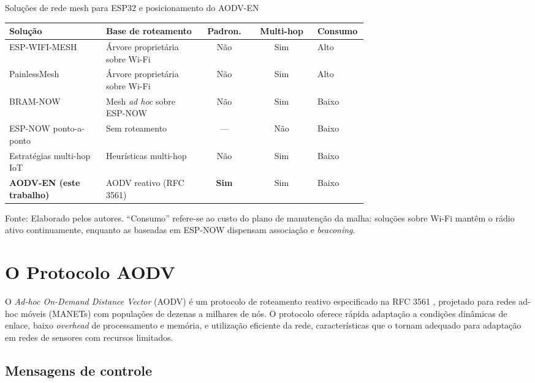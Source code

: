 \begin{quadro}[H]
\centering
\caption{Soluções de rede mesh para ESP32 e posicionamento do AODV-EN}\label{quadro:correlatos}
\begin{tabular}{@{}>{\raggedright\arraybackslash}p{0.27\linewidth}>{\raggedright\arraybackslash}p{0.27\linewidth}cc>{\raggedright\arraybackslash}p{0.14\linewidth}@{}}
\toprule
Solução & Base de roteamento & Padron. & Multi-hop & Consumo \\
\midrule
ESP-WIFI-MESH \cite{sestak2022} & Árvore proprietária sobre Wi-Fi & Não & Sim & Alto \\
PainlessMesh \cite{sestak2022} & Árvore proprietária sobre Wi-Fi & Não & Sim & Alto \\
BRAM-NOW \cite{cujilema2023} & Mesh \emph{ad hoc} sobre ESP-NOW & Não & Sim & Baixo \\
ESP-NOW ponto-a-ponto \cite{becker2025} & Sem roteamento & --- & Não & Baixo \\
Estratégias multi-hop IoT \cite{arregui2025} & Heurísticas multi-hop & Não & Sim & Baixo \\
\textbf{AODV-EN (este trabalho)} & AODV reativo (RFC 3561) & \textbf{Sim} & Sim & Baixo \\
\bottomrule
\end{tabular}

\vspace{2pt}
{\footnotesize Fonte: Elaborado pelos autores. ``Consumo'' refere-se ao custo do plano de manutenção da malha: soluções sobre Wi-Fi mantêm o rádio ativo continuamente, enquanto as baseadas em ESP-NOW dispensam associação e \emph{beaconing}.}
\end{quadro}

\section{O Protocolo AODV}\label{o-protocolo-aodv}

O \emph{Ad-hoc On-Demand Distance Vector} (AODV) é um protocolo de
roteamento reativo especificado na RFC 3561 \cite{perkins2003},
projetado para redes ad-hoc móveis (MANETs) com populações de dezenas a
milhares de nós. O protocolo oferece rápida adaptação a condições
dinâmicas de enlace, baixo \emph{overhead} de processamento e memória, e
utilização eficiente da rede, características que o tornam adequado para
adaptação em redes de sensores com recursos limitados.

\subsection{Mensagens de controle}\label{mensagens-de-controle}

